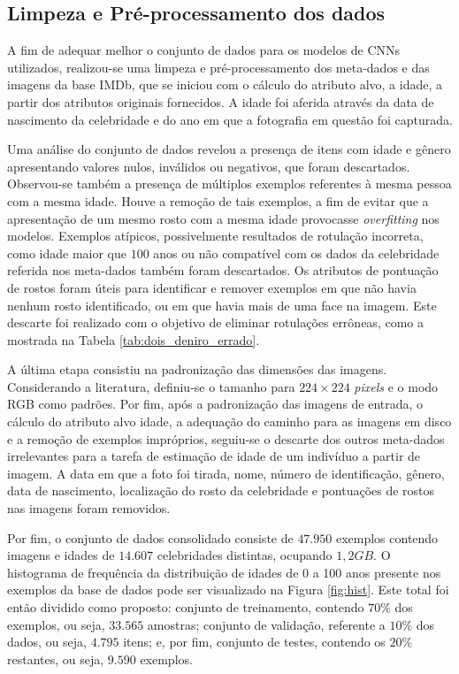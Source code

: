 \subsection{Limpeza e Pré-processamento dos dados}

A fim de adequar melhor o conjunto de dados para os modelos de CNNs utilizados, realizou-se uma limpeza e pré-processamento dos meta-dados e das imagens da base IMDb, que se iniciou com o cálculo do atributo alvo, a idade, a partir dos atributos originais fornecidos. A idade foi aferida através da data de nascimento da celebridade e do ano em que a fotografia em questão foi capturada.

Uma análise do conjunto de dados revelou a presença de itens com idade e gênero apresentando valores nulos, inválidos ou negativos, que foram descartados. Observou-se também a presença de múltiplos exemplos referentes à mesma pessoa com a mesma idade. Houve a remoção de tais exemplos, a fim de evitar que a apresentação de um mesmo rosto com a mesma idade provocasse \emph{overfitting} nos modelos. Exemplos atípicos, possivelmente resultados de rotulação incorreta, como idade maior que $100$ anos ou não compatível com os dados da celebridade referida nos meta-dados também foram descartados. Os atributos de pontuação de rostos foram úteis para identificar e remover exemplos em que não havia nenhum rosto identificado, ou em que havia mais de uma face na imagem. Este descarte foi realizado com o objetivo de eliminar rotulações errôneas, como a mostrada na Tabela \ref{tab:dois_deniro_errado}.

A última etapa consistiu na padronização das dimensões das imagens. Considerando a literatura, definiu-se o tamanho para $224 \times 224$ \emph{pixels} e o modo RGB como padrões. Por fim, após a padronização das imagens de entrada, o cálculo do atributo alvo idade, a adequação do caminho para as imagens em disco e a remoção de exemplos impróprios, seguiu-se o descarte dos outros meta-dados irrelevantes para a tarefa de estimação de idade de um indivíduo a partir de imagem. A data em que a foto foi tirada, nome, número de identificação, gênero, data de nascimento, localização do rosto da celebridade e pontuações de rostos nas imagens foram removidos.

Por fim, o conjunto de dados consolidado consiste de $47.950$ exemplos contendo imagens e idades de $14.607$ celebridades distintas, ocupando $1,2 GB$. O histograma de frequência da distribuição de idades de 0 a 100 anos presente nos exemplos da base de dados pode ser visualizado na Figura \ref{fig:hist}. Este total foi então dividido como proposto: conjunto de treinamento, contendo $70\%$ dos exemplos, ou seja, $33.565$ amostras; conjunto de validação, referente a $10\%$ dos dados, ou seja, $4.795$ itens; e, por fim, conjunto de testes, contendo os $20\%$ restantes, ou seja, $9.590$ exemplos.

